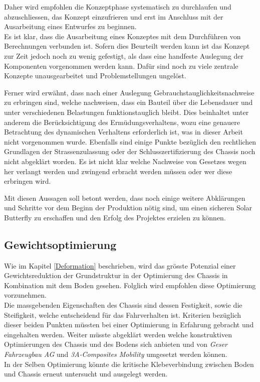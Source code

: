 Daher wird empfohlen die Konzeptphase systematisch zu durchlaufen und abzuschliessen, das Konzept einzufrieren und erst im Anschluss mit der Ausarbeitung eines Entwurfes zu beginnen.\\
Es ist klar, dass die Ausarbeitung eines Konzeptes mit dem Durchführen von Berechnungen verbunden ist. Sofern dies Beurteilt werden kann ist das Konzept zur Zeit jedoch noch zu wenig gefestigt, als dass eine handfeste Auslegung der Komponenten vorgenommen werden kann. Dafür sind noch zu viele zentrale Konzepte unausgearbeitet und Problemstellungen ungelöst.

Ferner wird erwähnt, dass nach einer Auslegung Gebrauchstauglichkeitsnachweise zu erbringen sind, welche nachweisen, dass ein Bauteil über die Lebensdauer und unter verschiedenen Belastungen funktionstauglich bleibt. Dies beinhaltet unter anderem die Berücksichtigung des Ermüdungsverhaltens, wozu eine genauere Betrachtung des dynamischen Verhaltens erforderlich ist, was in dieser Arbeit nicht vorgenommen wurde.
Ebenfalls sind einige Punkte bezüglich den rechtlichen Grundlagen der Strassenzulassung oder der Schlusszertifizierung des Chassis noch nicht abgeklärt worden. Es ist nicht klar welche Nachweise von Gesetzes wegen her verlangt werden und zwingend erbracht werden müssen oder wer diese erbringen wird.

Mit diesen Aussagen soll betont werden, dass noch einige weitere Abklärungen und Schritte vor dem Beginn der Produktion nötig sind, um einen sicheren Solar Butterfly zu erschaffen und den Erfolg des Projektes erzielen zu können.

\subsection{Gewichtsoptimierung}
Wie im Kapitel \ref{Deformation} beschrieben, wird das grösste Potenzial einer Gewichtsreduktion der Grundstruktur in der Optimierung des Chassis in Kombination mit dem Boden gesehen. Folglich wird empfohlen diese Optimierung vorzunehmen.\\
Die massgebenden Eigenschaften des Chassis sind dessen Festigkeit, sowie die Steifigkeit, welche entscheidend für das Fahrverhalten ist. Kriterien bezüglich dieser beiden Punkten müssten bei einer Optimierung in Erfahrung gebracht und eingehalten werden. Weiter müsste abgeklärt werden welche konstruktiven Optimierungen des Chassis und des Bodens sich anbieten und von \emph{Geser Fahrzeugbau AG} und \emph{3A-Composites Mobility} umgesetzt werden können.\\
In der Selben Optimierung könnte die kritische Klebeverbindung zwischen Boden und Chassis erneut untersucht und ausgelegt werden.

